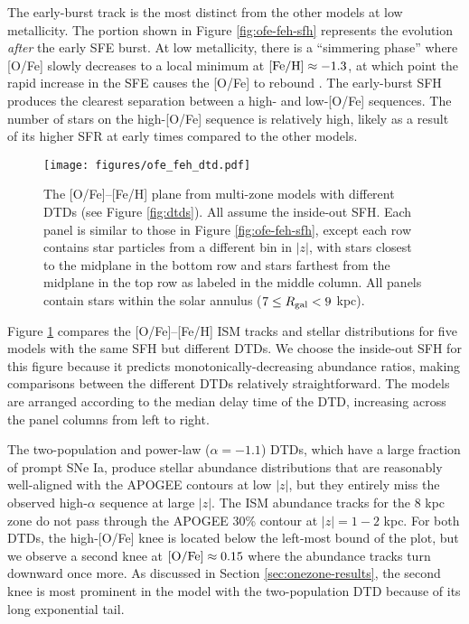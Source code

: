 \documentclass[twocolumn,twocolappendix,linenumbers]{aastex631}
\begin{document}
The early-burst track is the most distinct from the other models at low metallicity. The portion shown in Figure \ref{fig:ofe-feh-sfh} represents the evolution {\it after} the early SFE burst. At low metallicity, there is a ``simmering phase'' where [O/Fe] slowly decreases to a local minimum at ${\rm [Fe/H]}\approx-1.3$, at which point the rapid increase in the SFE causes the [O/Fe] to rebound \citep[a more thorough examination of this behavior can be found in][]{Conroy2022-ThickDisk}.
The early-burst SFH produces the clearest separation between a high- and low-[O/Fe] sequences. The number of stars on the high-[O/Fe] sequence is relatively high, likely as a result of its higher SFR at early times compared to the other models.

\begin{figure*}
    \centering
    \texttt{[image: figures/ofe\_feh\_dtd.pdf]}
    \caption{The [O/Fe]--[Fe/H] plane from multi-zone models with different DTDs (see Figure \ref{fig:dtds}). All assume the inside-out SFH. Each panel is similar to those in Figure \ref{fig:ofe-feh-sfh}, except each row contains star particles from a different bin in $|z|$, with stars closest to the midplane in the bottom row and stars farthest from the midplane in the top row as labeled in the middle column. All panels contain stars within the solar annulus ($7\leq R_{\rm gal}<9$ kpc).}
    \label{fig:ofe-feh-dtd}
\end{figure*}

Figure \ref{fig:ofe-feh-dtd} compares the [O/Fe]--[Fe/H] ISM tracks and stellar distributions for five models with the same SFH but different DTDs. We choose the inside-out SFH for this figure because it predicts monotonically-decreasing abundance ratios, making comparisons between the different DTDs relatively straightforward. The models are arranged according to the median delay time of the DTD, increasing across the panel columns from left to right. 

The two-population and power-law ($\alpha=-1.1$) DTDs, which have a large fraction of prompt SNe Ia, produce stellar abundance distributions that are reasonably well-aligned with the APOGEE contours at low $|z|$, but they entirely miss the observed high-$\alpha$ sequence at large $|z|$. The ISM abundance tracks for the 8 kpc zone do not pass through the APOGEE 30\% contour at $|z|=1-2$ kpc. For both DTDs, the high-[O/Fe] knee is located below the left-most bound of the plot, but we observe a second knee at ${\rm [O/Fe]}\approx0.15$ where the abundance tracks turn downward once more. As discussed in Section \ref{sec:onezone-results}, the second knee is most prominent in the model with the two-population DTD because of its long exponential tail.
\end{document}
